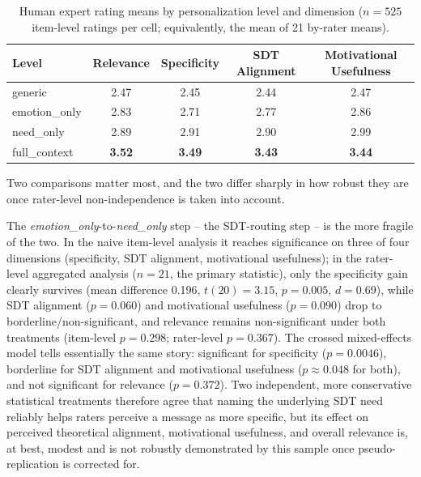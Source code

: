 \documentclass[higheredu,article,submit,pdftex,moreauthors]{Definitions/mdpi}
\begin{document}
\begin{table}[H]
\caption{Human expert rating means by personalization level and dimension ($n=525$ item-level ratings per cell; equivalently, the mean of 21 by-rater means).\label{tab:human-staircase}}
\begin{tabularx}{\textwidth}{lCCCC}
\toprule
\textbf{Level} & \textbf{Relevance} & \textbf{Specificity} & \textbf{SDT Alignment} & \textbf{Motivational Usefulness} \\
\midrule
generic & 2.47 & 2.45 & 2.44 & 2.47 \\
emotion\_only & 2.83 & 2.71 & 2.77 & 2.86 \\
need\_only & 2.89 & 2.91 & 2.90 & 2.99 \\
full\_context & \textbf{3.52} & \textbf{3.49} & \textbf{3.43} & \textbf{3.44} \\
\bottomrule
\end{tabularx}
\end{table}
\label{sec:human-results}

Two comparisons matter most, and the two differ sharply in how robust they are once rater-level non-independence is taken into account.

The \textit{emotion\_only}-to-\textit{need\_only} step -- the SDT-routing step -- is the more fragile of the two. In the naive item-level analysis it reaches significance on three of four dimensions (specificity, SDT alignment, motivational usefulness); in the rater-level aggregated analysis ($n=21$, the primary statistic), only the specificity gain clearly survives (mean difference 0.196, $t(20)=3.15$, $p=0.005$, $d=0.69$), while SDT alignment ($p=0.060$) and motivational usefulness ($p=0.090$) drop to borderline/non-significant, and relevance remains non-significant under both treatments (item-level $p=0.298$; rater-level $p=0.367$). The crossed mixed-effects model tells essentially the same story: significant for specificity ($p=0.0046$), borderline for SDT alignment and motivational usefulness ($p\approx0.048$ for both), and not significant for relevance ($p=0.372$). Two independent, more conservative statistical treatments therefore agree that naming the underlying SDT need reliably helps raters perceive a message as more specific, but its effect on perceived theoretical alignment, motivational usefulness, and overall relevance is, at best, modest and is not robustly demonstrated by this sample once pseudo-replication is corrected for.
\end{document}
